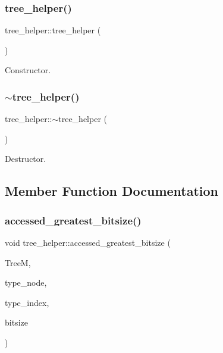 \subsubsection{\texorpdfstring{tree\+\_\+helper()}{tree\_helper()}}
{\footnotesize\ttfamily tree\+\_\+helper\+::tree\+\_\+helper (\begin{DoxyParamCaption}{ }\end{DoxyParamCaption})\hspace{0.3cm}{\ttfamily [default]}}



Constructor. 

\mbox{\label{classtree__helper_a8c1bf5aa8d055290ce98a45ec71b1ab9}} 
\subsubsection{\texorpdfstring{$\sim$tree\+\_\+helper()}{~tree\_helper()}}
{\footnotesize\ttfamily tree\+\_\+helper\+::$\sim$tree\+\_\+helper (\begin{DoxyParamCaption}{ }\end{DoxyParamCaption})\hspace{0.3cm}{\ttfamily [default]}}



Destructor. 



\subsection{Member Function Documentation}
\mbox{\label{classtree__helper_a4bb90d532741ab00cea548b765e0f420}} 
\subsubsection{\texorpdfstring{accessed\+\_\+greatest\+\_\+bitsize()}{accessed\_greatest\_bitsize()}}
{\footnotesize\ttfamily void tree\+\_\+helper\+::accessed\+\_\+greatest\+\_\+bitsize (\begin{DoxyParamCaption}\item[{const \hyperlink{tree__manager_8hpp_a792e3f1f892d7d997a8d8a4a12e39346}{tree\+\_\+manager\+Const\+Ref} \&}]{TreeM,  }\item[{const \hyperlink{tree__node_8hpp_a6ee377554d1c4871ad66a337eaa67fd5}{tree\+\_\+node\+Ref} \&}]{type\+\_\+node,  }\item[{unsigned int}]{type\+\_\+index,  }\item[{unsigned int \&}]{bitsize }\end{DoxyParamCaption})\hspace{0.3cm}{\ttfamily [static]}}



